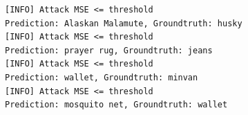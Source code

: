 \documentclass[11pt]{article}
\begin{document}
    \begin{Verbatim}[commandchars=\\\{\}]
[INFO] Attack MSE <= threshold
Prediction: Alaskan Malamute, Groundtruth: husky
[INFO] Attack MSE <= threshold
Prediction: prayer rug, Groundtruth: jeans
[INFO] Attack MSE <= threshold
Prediction: wallet, Groundtruth: minvan
[INFO] Attack MSE <= threshold
Prediction: mosquito net, Groundtruth: wallet

    \end{Verbatim}

    \begin{center}
    \end{center}
    { \hspace*{\fill} \\}
    

    
    
    
    
\end{document}
